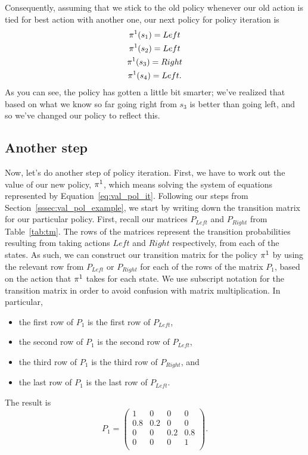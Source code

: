 \documentclass[a4paper]{article}
\begin{document}
Consequently, assuming that we stick to the old policy whenever our
old action is tied for best action with another one,
our next policy for policy iteration is
\begin{gather*}
  \pi^1(s_1) = Left \\
  \pi^1(s_2) = Left \\
  \pi^1(s_3) = Right \\
  \pi^1(s_4) = Left .
\end{gather*}
As you can see, the policy has gotten a little bit smarter;
we've realized that based on what we know so far
going right from $s_3$ is better than going left,
and so we've changed our policy to reflect this.

\subsection{Another step}
Now, let's do another step of policy iteration.
First, we have to work out the value of our new policy, $\pi^1$,
which means solving the system of equations represented by
Equation~\ref{eq:val_pol_it}.
Following our steps from Section~\ref{sssec:val_pol_example},
we start by writing down the transition matrix for our particular
policy.
First, recall our matrices $P_{Left}$ and $P_{Right}$ from
Table~\ref{tab:tm}.
The rows of the matrices represent the transition probabilities
resulting from taking actions $Left$ and $Right$ respectively,
from each of the states.
As such, we can construct our transition matrix for the policy
$\pi^1$ by using the relevant row from $P_{Left}$ or $P_{Right}$
for each of the rows of the matrix $P_1$,
based on the action that $\pi^1$ takes for each state.
We use subscript notation for the transition matrix in order
to avoid confusion with matrix multiplication.
In particular,
\begin{itemize}
  \item the first row of $P_1$ is the first row of $P_{Left}$,
  \item the second row of $P_1$ is the second row of $P_{Left}$,
  \item the third row of $P_1$ is the third row of $P_{Right}$, and
  \item the last row of $P_1$ is the last row of $P_{Left}$.
\end{itemize}
The result is
\begin{equation*}
  P_1 =
  \begin{pmatrix}
      1   & 0   & 0   & 0   \\
      0.8 & 0.2 & 0   & 0   \\
      0   & 0   & 0.2 & 0.8 \\
      0   & 0   & 0   & 1   \\
  \end{pmatrix} .
\end{equation*}
\end{document}
